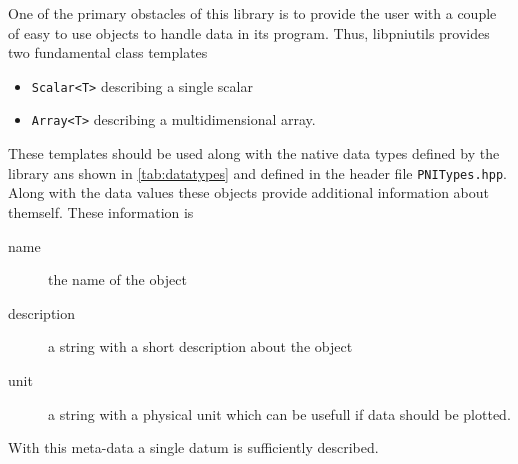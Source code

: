 
One of the primary obstacles of this library is to provide the user with a 
couple of easy to use objects to handle data in its program. 
Thus, libpniutils provides two fundamental class templates
\begin{itemize}
  \item {\tt Scalar<T>} describing a single scalar
  \item {\tt Array<T>} describing a multidimensional array.
\end{itemize}
These templates should be used along with the native data types defined by the 
library ans shown in \ref{tab:datatypes} and defined in the header file
{\tt PNITypes.hpp}.
Along with the data values these objects provide additional information 
about themself. These information is
\begin{description}
\item[name] the name of the object
\item[description] a string with a short description about the object
\item[unit] a string with a physical unit which can be usefull if data 
            should be plotted.
\end{description} 
With this meta-data a single datum is sufficiently described. 


